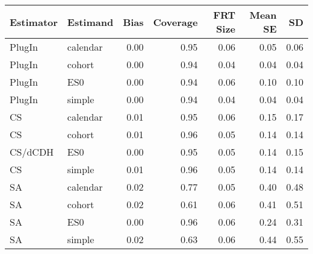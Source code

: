 \captionsetup[table]{labelformat=empty,skip=1pt}
\begin{longtable}{llrrrrr}
\toprule
Estimator & Estimand & Bias & Coverage & FRT Size & Mean SE & SD \\ 
\midrule
PlugIn & calendar & 0.00 & 0.95 & 0.06 & 0.05 & 0.06 \\ 
PlugIn & cohort & 0.00 & 0.94 & 0.04 & 0.04 & 0.04 \\ 
PlugIn & ES0 & 0.00 & 0.94 & 0.06 & 0.10 & 0.10 \\ 
PlugIn & simple & 0.00 & 0.94 & 0.04 & 0.04 & 0.04 \\ 
CS & calendar & 0.01 & 0.95 & 0.06 & 0.15 & 0.17 \\ 
CS & cohort & 0.01 & 0.96 & 0.05 & 0.14 & 0.14 \\ 
CS/dCDH & ES0 & 0.00 & 0.95 & 0.05 & 0.14 & 0.15 \\ 
CS & simple & 0.01 & 0.96 & 0.05 & 0.14 & 0.14 \\ 
SA & calendar & 0.02 & 0.77 & 0.05 & 0.40 & 0.48 \\ 
SA & cohort & 0.02 & 0.61 & 0.06 & 0.41 & 0.51 \\ 
SA & ES0 & 0.00 & 0.96 & 0.06 & 0.24 & 0.31 \\ 
SA & simple & 0.02 & 0.63 & 0.06 & 0.44 & 0.55 \\ 
 \bottomrule
\end{longtable}

